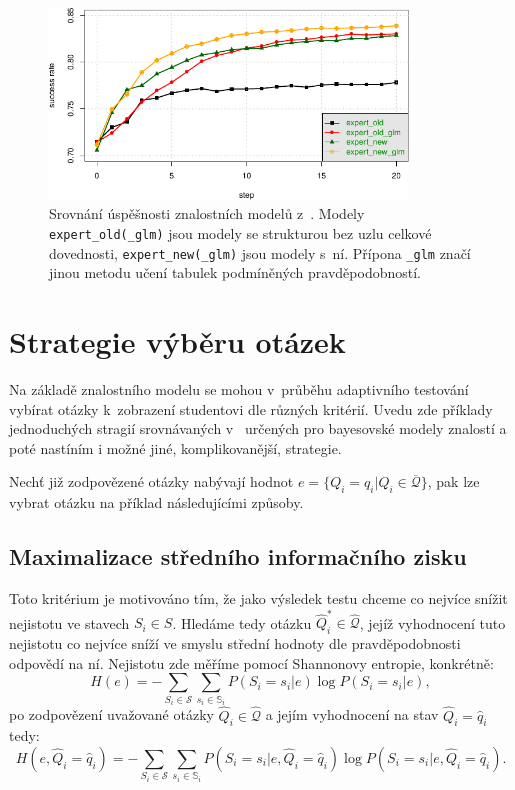 \documentclass[a4paper,twoside,12pt]{scrbook}
\begin{document}
\begin{figure}
  \centering
    \includegraphics[width=0.85\textwidth]{comparison_chart_plajner16.pdf}
  \caption{Srovnání úspěšnosti znalostních modelů z~\cite{plajner16}. Modely \texttt{expert\_old(\_glm)} jsou modely se strukturou bez uzlu celkové dovednosti, \texttt{expert\_new(\_glm)} jsou modely s~ní. Přípona \texttt{\_glm} značí jinou metodu učení tabulek podmíněných pravděpodobností.}
  \label{fig:comparison_chart_plajner16}
\end{figure}


\section{Strategie výběru otázek}
\label{sec:question_selection}
Na základě znalostního modelu se mohou v~průběhu adaptivního testování vybírat otázky k~zobrazení studentovi dle různých kritérií. Uvedu zde příklady jednoduchých  stragií srovnávaných v~\cite{question_selection} určených pro bayesovské modely znalostí a poté nastíním i možné jiné, komplikovanější, strategie.

Nechť již zodpovězené otázky nabývají hodnot $e=\{Q_i=q_i|Q_i\in\overline{\mathcal{Q}}\}$, pak lze vybrat otázku na příklad následujícími způsoby.

\subsection{Maximalizace středního informačního zisku}
\label{subsec:information_gain}
Toto kritérium je motivováno tím, že jako výsledek testu chceme co nejvíce snížit nejistotu ve stavech $S_i \in S$. Hledáme tedy otázku $\widehat{Q}^*_i \in \widehat{\mathcal{Q}}$, jejíž vyhodnocení tuto nejistotu co nejvíce sníží ve smyslu střední hodnoty dle pravděpodobnosti odpovědí na ní. Nejistotu zde měříme pomocí Shannonovy entropie, konkrétně:
\begin{equation}
	H(e) = -\sum_{S_i \in \mathcal{S}}\sum_{s_i \in \mathbb{S}_i}P(S_i=s_i|e) \log{}P(S_i=s_i|e),
\end{equation}
po zodpovězení uvažované otázky $\widehat{Q}_i \in \widehat{\mathcal{Q}}$ a jejím vyhodnocení na stav $\widehat{Q}_i = \widehat{q}_i$ tedy:
\begin{equation}
	H(e, \widehat{Q}_i = \widehat{q}_i) = -\sum_{S_i \in \mathcal{S}}\sum_{s_i \in \mathbb{S}_i}P(S_i=s_i|e, \widehat{Q}_i = \widehat{q}_i) \log{}P(S_i=s_i|e, \widehat{Q}_i = \widehat{q}_i).
\end{equation}
\end{document}
